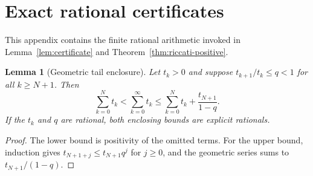 \documentclass[preprint,12pt]{elsarticle}
\theoremstyle{plain}
\newtheorem{lemma}[theorem]{Lemma}
\theoremstyle{definition}
\theoremstyle{remark}
\begin{document}
\section{Exact rational certificates}\label{app:certificates}

This appendix contains the finite rational arithmetic invoked in
Lemma~\ref{lem:certificate} and Theorem~\ref{thm:riccati-positive}.

\begin{lemma}[Geometric tail enclosure]\label{lem:tail}
Let \(t_k>0\) and suppose \(t_{k+1}/t_k\le q<1\) for all \(k\ge N+1\). Then
\begin{equation}\label{eq:tail-enclosure}
\sum_{k=0}^{N}t_k<\sum_{k=0}^{\infty}t_k
\le\sum_{k=0}^{N}t_k+\frac{t_{N+1}}{1-q}.
\end{equation}
If the \(t_k\) and \(q\) are rational, both enclosing bounds are explicit
rationals.
\end{lemma}
\begin{proof}
The lower bound is positivity of the omitted terms. For the upper bound,
induction gives \(t_{N+1+j}\le t_{N+1}q^{j}\) for \(j\ge0\), and the geometric
series sums to \(t_{N+1}/(1-q)\).
\end{proof}
\end{document}
